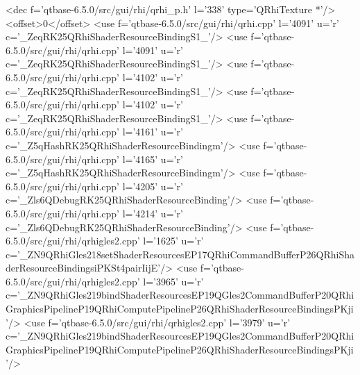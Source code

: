 <dec f='qtbase-6.5.0/src/gui/rhi/qrhi_p.h' l='338' type='QRhiTexture *'/>
<offset>0</offset>
<use f='qtbase-6.5.0/src/gui/rhi/qrhi.cpp' l='4091' u='r' c='_ZeqRK25QRhiShaderResourceBindingS1_'/>
<use f='qtbase-6.5.0/src/gui/rhi/qrhi.cpp' l='4091' u='r' c='_ZeqRK25QRhiShaderResourceBindingS1_'/>
<use f='qtbase-6.5.0/src/gui/rhi/qrhi.cpp' l='4102' u='r' c='_ZeqRK25QRhiShaderResourceBindingS1_'/>
<use f='qtbase-6.5.0/src/gui/rhi/qrhi.cpp' l='4102' u='r' c='_ZeqRK25QRhiShaderResourceBindingS1_'/>
<use f='qtbase-6.5.0/src/gui/rhi/qrhi.cpp' l='4161' u='r' c='_Z5qHashRK25QRhiShaderResourceBindingm'/>
<use f='qtbase-6.5.0/src/gui/rhi/qrhi.cpp' l='4165' u='r' c='_Z5qHashRK25QRhiShaderResourceBindingm'/>
<use f='qtbase-6.5.0/src/gui/rhi/qrhi.cpp' l='4205' u='r' c='_Zls6QDebugRK25QRhiShaderResourceBinding'/>
<use f='qtbase-6.5.0/src/gui/rhi/qrhi.cpp' l='4214' u='r' c='_Zls6QDebugRK25QRhiShaderResourceBinding'/>
<use f='qtbase-6.5.0/src/gui/rhi/qrhigles2.cpp' l='1625' u='r' c='_ZN9QRhiGles218setShaderResourcesEP17QRhiCommandBufferP26QRhiShaderResourceBindingsiPKSt4pairIijE'/>
<use f='qtbase-6.5.0/src/gui/rhi/qrhigles2.cpp' l='3965' u='r' c='_ZN9QRhiGles219bindShaderResourcesEP19QGles2CommandBufferP20QRhiGraphicsPipelineP19QRhiComputePipelineP26QRhiShaderResourceBindingsPKji'/>
<use f='qtbase-6.5.0/src/gui/rhi/qrhigles2.cpp' l='3979' u='r' c='_ZN9QRhiGles219bindShaderResourcesEP19QGles2CommandBufferP20QRhiGraphicsPipelineP19QRhiComputePipelineP26QRhiShaderResourceBindingsPKji'/>
